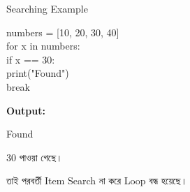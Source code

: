 \begin{codeoutputbox}{Searching Example}

\noindent
\begin{minipage}[t]{0.56\linewidth}
\codeheading

\begin{english}
\ttfamily
numbers = [10, 20, 30, 40]\\
for x in numbers:\\
\hspace*{4mm}if x == 30:\\
\hspace*{8mm}print("Found")\\
\hspace*{8mm}break
\end{english}

\end{minipage}
\hfill
\begin{minipage}[t]{0.40\linewidth}
\outputheading

\textbf{Output:}

\begin{center}
\textenglish{\ttfamily Found}
\end{center}

30 পাওয়া গেছে।

তাই পরবর্তী Item Search না করে Loop বন্ধ হয়েছে।

\end{minipage}

\end{codeoutputbox}



